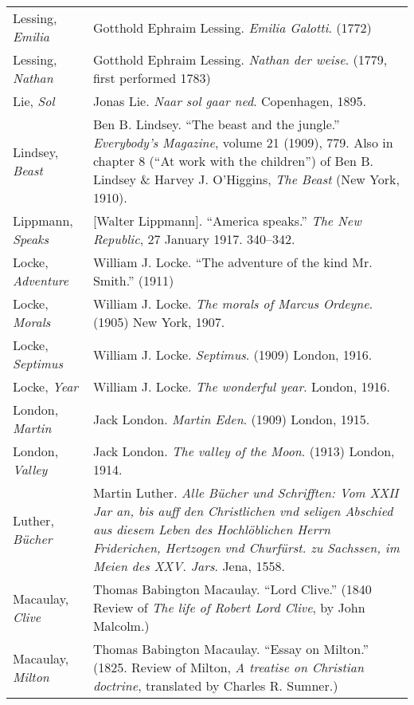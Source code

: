 \begin{longtable}{p{} p{}}
Lessing, \textit{Emilia} & Gotthold Ephraim Lessing. \textit{Emilia Galotti}. (1772) \\
Lessing, \textit{Nathan} & Gotthold Ephraim Lessing. \textit{Nathan der weise}. (1779, first performed 1783) \\
%

Lie, \textit{Sol} & Jonas Lie. \textit{Naar sol gaar ned}. Copenhagen, 1895.\\

Lindsey, \textit{Beast} & Ben B. Lindsey. ``The beast and the jungle.'' \textit{Everybody's Magazine}, volume 21 (1909), 779. %
Also in chapter 8 (``At work with the children'') of Ben B. Lindsey \& Harvey J. O'Higgins, \textit{The Beast} (New York, 1910). \\

Lippmann, \textit{Speaks} & [Walter Lippmann]. ``America speaks.'' \textit{The New Republic}, 27 January 1917. 340--342. \\

Locke, \textit{Adventure} & William J. Locke. ``The adventure of the kind Mr. Smith.'' (1911) \\
Locke, \textit{Morals} & William J. Locke. \textit{The morals of Marcus Ordeyne}. (1905) New York, 1907. \\ %
Locke, \textit{Septimus} & William J. Locke. \textit{Septimus}. (1909) London, 1916. \\
Locke, \textit{Year} & William J. Locke. \textit{The wonderful year}. London, 1916. \\

London, \textit{Martin} & Jack London. \textit{Martin Eden}. (1909) London, 1915. \\
London, \textit{Valley} & Jack London. \textit{The valley of the Moon}. (1913) London, 1914. \\

Luther, \textit{Bücher} & Martin Luther. \textit{Alle Bücher und Schrifften: Vom XXII Jar an, bis auff den Christlichen vnd seligen Abschied aus diesem Leben des Hochlöblichen Herrn Friderichen, Hertzogen vnd Churfürst. zu Sachssen, im Meien des XXV. Jars}. Jena, 1558. \\

Macaulay, \textit{Clive} & Thomas Babington Macaulay. ``Lord Clive.'' (1840 Review of \textit{The life of Robert Lord Clive}, by John Malcolm.) \\
Macaulay, \textit{Milton} & Thomas Babington Macaulay. ``Essay on Milton.'' (1825. Review of Milton, \textit{A treatise on Christian doctrine}, translated by Charles R. Sumner.) \\


\end{longtable}
